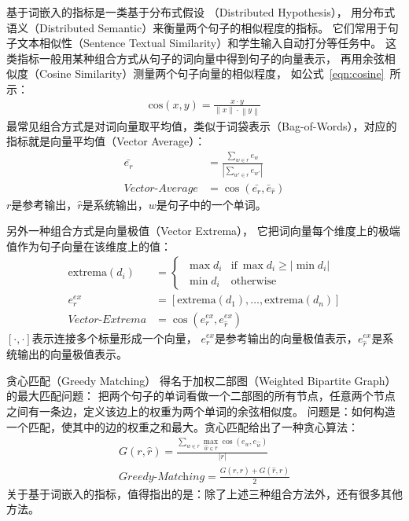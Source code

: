 基于词嵌入的指标是一类基于分布式假设
（Distributed Hypothesis），
用分布式语义（Distributed Semantic）来衡量两个句子的相似程度的指标。
它们常用于句子文本相似性（Sentence Textual Similarity）和学生输入自动打分等任务中。
这类指标一般用某种组合方式从句子的词向量中得到句子的向量表示，
再用余弦相似度（Cosine Similarity）测量两个句子向量的相似程度，
如公式~\ref{eqn:cosine}~所示：
\begin{align}
    \text{cos}(x, y) = \frac{x\cdot y}
    {\left\| x \right\| \cdot \left\| y \right\|}
    \label{eqn:cosine}
\end{align}
最常见组合方式是对词向量取平均值，类似于词袋表示（Bag-of-Words），对应的指标就是向量平均值（Vector Average）：
\begin{align}
    \bar{e_r} &= \frac{\sum_{w \in r} e_w}{|\sum_{w' \in r} e_{w'}|} \\
    \textit{Vector-Average} &= \cos(\bar{e_r}, \bar{e}_{\hat{r}})
\end{align}
$r$是参考输出，$\hat{r}$是系统输出，$w$是句子中的一个单词。

另外一种组合方式是向量极值（Vector Extrema），
它把词向量每个维度上的极端值作为句子向量在该维度上的值：
\begin{align}
    \text{extrema}(d_i) &=
    \begin{cases}
        \ \max d_i & \text{if}\ \max d_i \geq |\min d_i| \\
        \ \min d_i & \text{otherwise}
    \end{cases} \\
    e_r^{ex} &= [\text{extrema}(d_1), \dots, \text{extrema}(d_n)] \\
    \textit{Vector-Extrema} &= \cos( e_r^{ex}, e_{\hat{r}}^{ex} )
\end{align}
$[\cdot, \cdot]$表示连接多个标量形成一个向量，
$e_r^{ex}$是参考输出的向量极值表示，$e_{\hat{r}}^{ex}$是系统输出的向量极值表示。

贪心匹配（Greedy Matching）
得名于加权二部图（Weighted Bipartite Graph）的最大匹配问题：
把两个句子的单词看做一个二部图的所有节点，任意两个节点之间有一条边，定义该边上的权重为两个单词的余弦相似度。
问题是：如何构造一个匹配，使其中的边的权重之和最大。贪心匹配给出了一种贪心算法：
\begin{align}
    G(r, \hat{r}) = \frac{
    \sum_{w \in r} \max_{\hat{w} \in \hat{r}} \cos(e_w, e_{\hat{w}})
    }{ |r| } \\
    \textit{Greedy-Matching} = \frac{
    G(r, \hat{r}) + G(\hat{r}, r)
    }{2}
\end{align}
关于基于词嵌入的指标，值得指出的是：除了上述三种组合方法外，还有很多其他方法。


